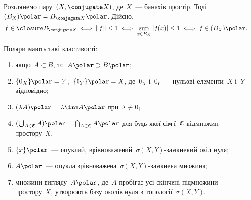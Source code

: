 \begin{example}
    Розглянемо пару~$(X, \conjugate X)$, де~$X$~--- банахів простір. Тоді~$(B_X)\polar = B_{\conjugate X}\polar$. Дійсно,
    \begin{equation*}
        f \in \closure B_{\conjugate X} \iff \|f\| \le 1 \iff \sup_{x \in B_X} |f(x)| \le 1 \iff f \in (B_X)\polar.
    \end{equation*}
\end{example}

\begin{theorem}
    Поляри мають такі властивості:
    \begin{enumerate}
        \item якщо~$A \subset B$, то~$A\polar \supset B\polar$;
        \item $\{0_X\}\polar = Y$,~$\{0_Y\}\polar = X$, де~$0_X$ і~$0_Y$~--- нульові елементи~$X$ і~$Y$ відповідно;
        \item $(\lambda A)\polar = \lambda\inv A\polar$ при~$\lambda \ne 0$;
        \item $(\bigcup_{A \in \frak C} A)\polar = \bigcap_{A \in \frak C} A\polar$ для будь-якої сім'ї~$\frak C$ підмножин простору~$X$. %
        \item $\{x\}\polar$~--- опуклий, врівноважений~$\sigma(X, Y)$-замкнений окіл нуля; %
        \item $A\polar$~--- опукла врівноважена~$\sigma(X, Y)$-замкнена множина; %
        \item множини вигляду~$A\polar$, де~$A$ пробігає усі скінчені підмножини простору~$X$, утворюють базу околів нуля в топології~$\sigma(X, Y)$.
    \end{enumerate}
\end{theorem}

